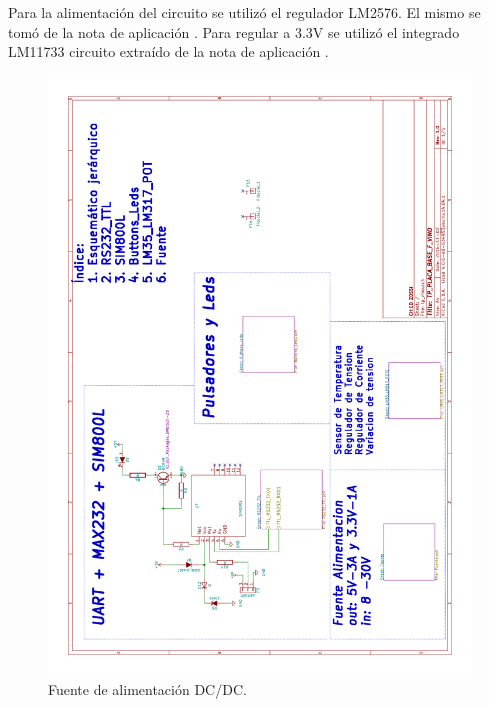 Para la alimentación del circuito se utilizó el regulador LM2576. El mismo se tomó de la nota de aplicación \citep{Texas:LM2576}.
Para regular a 3.3V se utilizó el integrado LM11733 circuito extraído de la nota de aplicación \citep{Texas:LM11733}.
\begin{figure}[!hp]
  \centering
  \includegraphics[page=3,scale=0.7,angle=270,clip,trim=2cm 3cm 6.5cm 2.5cm]{./Figures/schematic.pdf}
  \caption{Fuente de alimentación DC/DC.}
  \label{fig:fuente}
\end{figure}

